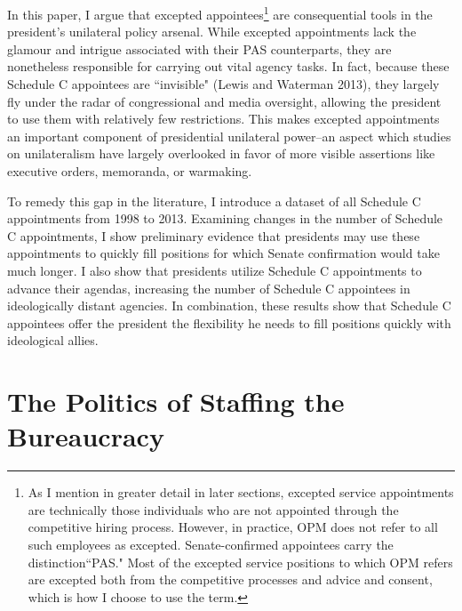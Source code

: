 \documentclass[12pt]{article}
\begin{document}
	In this paper, I argue that excepted appointees\footnote{As I mention in greater detail in later sections, excepted service appointments are technically those individuals who are not appointed through the competitive hiring process. However, in practice, OPM does not refer to all such employees as excepted. Senate-confirmed appointees carry the distinction``PAS." Most of the excepted service positions to which OPM refers are excepted both from the competitive processes and advice and consent, which is how I choose to use the term.} are consequential tools in the president's unilateral policy arsenal. While excepted appointments lack the glamour and intrigue associated with their PAS counterparts, they are nonetheless responsible for carrying out vital agency tasks. In fact, because these Schedule C appointees are ``invisible" (Lewis and Waterman 2013), they largely fly under the radar of congressional and media oversight, allowing the president to use them with relatively few restrictions. This makes excepted appointments an important component of presidential unilateral power--an aspect which studies on unilateralism have largely overlooked in favor of more visible assertions like executive orders, memoranda, or warmaking. 

		To remedy this gap in the literature, I introduce a dataset of all Schedule C appointments from 1998 to 2013. Examining changes in the number of Schedule C appointments, I show preliminary evidence that presidents may use these appointments to quickly fill positions for which Senate confirmation would take much longer. I also show that presidents utilize Schedule C appointments to advance their agendas, increasing the number of Schedule C appointees in ideologically distant agencies. In combination, these results show that Schedule C appointees offer the president the flexibility he needs to fill positions quickly with ideological allies.
		
\section*{The Politics of Staffing the Bureaucracy}
\end{document}
